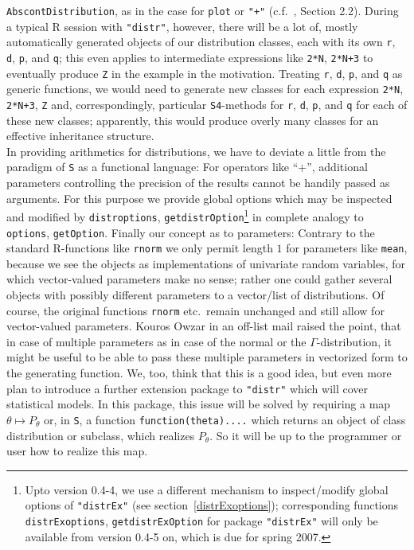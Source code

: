 \documentclass[11pt]{article}
\newcommand{\code}[1]{{\tt #1}}
\newcommand{\pkg}[1]{{\tt "#1"}}
\begin{document}
\code{AbscontDistribution}, as in the case for \code{plot} or \code{"+"} 
(c.f.\ \cite{K:R:S:04}, Section 2.2). 
During a typical {\sf R} session with \pkg{distr}, however, there will be a lot of, 
mostly automatically generated objects of our distribution classes, each with its 
own \code{r}, \code{d}, \code{p}, and \code{q}; this even applies to 
intermediate expressions like \code{2*N}, \code{2*N+3} to eventually produce 
\code{Z} in the example in the motivation. Treating \code{r}, \code{d}, 
\code{p}, and \code{q} as generic functions, we would need to generate new 
classes for each expression \code{2*N}, \code{2*N+3}, \code{Z} and, 
correspondingly, particular {\tt S4}-methods for \code{r}, \code{d}, \code{p}, 
and \code{q} for each of these new classes; apparently, this would produce overly 
many classes for an effective inheritance structure. \\
In providing arithmetics for distributions, we have to deviate a little from
the paradigm of {\tt S} as a functional language: For operators like ``$+$'',
additional parameters controlling the precision of the results cannot be handily
passed as arguments. For this purpose we provide global options which may be
inspected and modified by \code{distroptions}, \code{getdistrOption}\footnote{Upto version 0.4-4,
we use a different mechanism to inspect/modify global options of \pkg{distrEx}
(see section~\ref{distrExoptions}); corresponding functions \code{distrExoptions}, \code{getdistrExOption}
for package \pkg{distrEx} will only be available from version 0.4-5 on, which is
due for spring 2007.} in complete analogy to \code{options}, \code{getOption}.
%
Finally our concept as to parameters: Contrary to the standard {\sf R}-functions like 
\code{rnorm} we only permit length $1$ for parameters like \code{mean}, because 
we see the objects as implementations of univariate random variables, for which 
vector-valued parameters make no sense; rather one could gather several objects 
with possibly different parameters to a vector/list of distributions. Of course, the 
original functions \code{rnorm} etc.\ remain unchanged and still allow for 
vector-valued parameters.
Kouros Owzar  in an off-list mail raised the point, that in case of multiple parameters 
as in case of the normal or the $\Gamma$-distribution, it might be useful to be able 
to pass these multiple parameters in vectorized form to the generating function. 
We, too, think that this is a good idea, but even more plan to introduce a further
extension package to \pkg{distr} which will cover statistical models. In this package, 
this issue will be solved by requiring a map $\theta \mapsto P_\theta$ or, in {\tt S}, 
a function \code{function(theta){....}} which returns an object of class distribution 
or subclass, which realizes $P_\theta$. So it will be up to the programmer or user how 
to realize this map.
\end{document}
